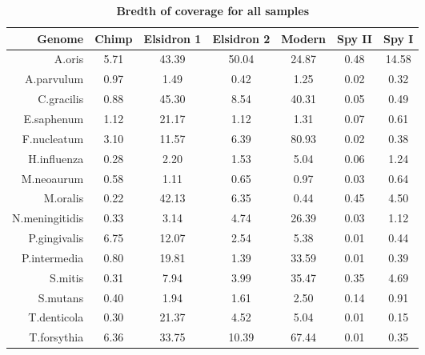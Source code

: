 \documentclass[12pt, a4paper]{article}
\begin{document}
\begin{table}[ht]
\centering
\small
\caption[Bredth of coverage for all samples]{\textbf{Bredth of coverage for all samples}}\label{table:coverage}
\begin{tabular}{rcccccc}
  \hline
 Genome & Chimp & Elsidron 1 & Elsidron 2 & Modern & Spy II & Spy I \\ 
  \hline
	A.oris & 5.71 & 43.39 & 50.04 & 24.87 & 0.48 & 14.58 \\ 
  	A.parvulum & 0.97 & 1.49 & 0.42 & 1.25 & 0.02 & 0.32 \\ 
  	C.gracilis & 0.88 & 45.30 & 8.54 & 40.31 & 0.05 & 0.49 \\ 
  	E.saphenum & 1.12 & 21.17 & 1.12 & 1.31 & 0.07 & 0.61 \\ 
  	F.nucleatum & 3.10 & 11.57 & 6.39 & 80.93 & 0.02 & 0.38 \\ 
  	H.influenza & 0.28 & 2.20 & 1.53 & 5.04 & 0.06 & 1.24 \\ 
  	M.neoaurum & 0.58 & 1.11 & 0.65 & 0.97 & 0.03 & 0.64 \\ 
  	M.oralis & 0.22 & 42.13 & 6.35 & 0.44 & 0.45 & 4.50 \\ 
  	N.meningitidis & 0.33 & 3.14 & 4.74 & 26.39 & 0.03 & 1.12 \\ 
  	P.gingivalis & 6.75 & 12.07 & 2.54 & 5.38 & 0.01 & 0.44 \\ 
  	P.intermedia & 0.80 & 19.81 & 1.39 & 33.59 & 0.01 & 0.39 \\ 
  	S.mitis & 0.31 & 7.94 & 3.99 & 35.47 & 0.35 & 4.69 \\ 
  	S.mutans & 0.40 & 1.94 & 1.61 & 2.50 & 0.14 & 0.91 \\ 
  	T.denticola & 0.30 & 21.37 & 4.52 & 5.04 & 0.01 & 0.15 \\ 
  	T.forsythia & 6.36 & 33.75 & 10.39 & 67.44 & 0.01 & 0.35 \\ 
   \hline
\end{tabular}
\end{table}
\end{document}
